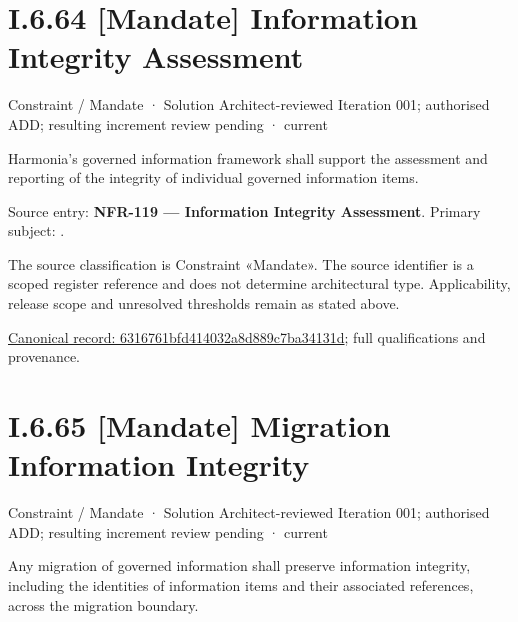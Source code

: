\section*{I.6.64 [Mandate] Information Integrity Assessment}
\label{navigation:I.6.64}

\label{element:6316761bfd414032a8d889c7ba34131d}
{\small Constraint / Mandate · Solution Architect-reviewed Iteration 001; authorised ADD; resulting increment review pending · current}\par

Harmonia's governed information framework shall support the assessment and reporting of the integrity of individual governed information items.



Source entry: \textbf{NFR-119 — Information Integrity Assessment}. Primary subject: \texttt{}.



The source classification is Constraint «Mandate». The source identifier is a scoped register reference and does not determine architectural type. Applicability, release scope and unresolved thresholds remain as stated above.


{\footnotesize \href{../../../../continuum/motivation/constraint/mandate/6316761bfd414032a8d889c7ba34131d.md}{Canonical record: 6316761bfd414032a8d889c7ba34131d}; full qualifications and provenance.}\par
\section*{I.6.65 [Mandate] Migration Information Integrity}
\label{navigation:I.6.65}

\label{element:22583ccb89dc4cf683c710760bc4b1f2}
{\small Constraint / Mandate · Solution Architect-reviewed Iteration 001; authorised ADD; resulting increment review pending · current}\par

Any migration of governed information shall preserve information integrity, including the identities of information items and their associated references, across the migration boundary.



